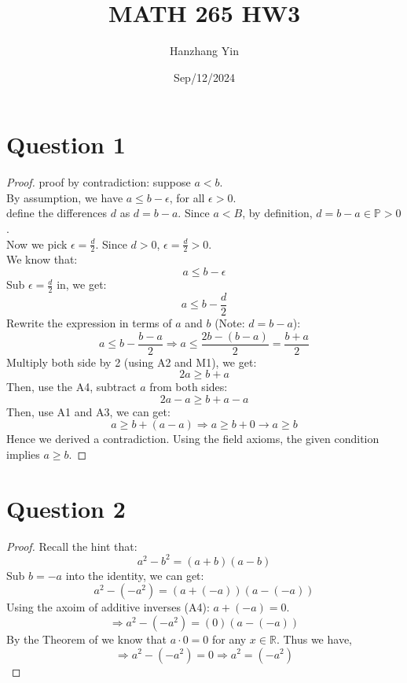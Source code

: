 \documentclass{article}
\title{MATH 265 HW3}
\author{Hanzhang Yin}
\date{Sep/12/2024}
\begin{document}
\maketitle

\section*{Question 1}
\begin{proof}
    proof by contradiction: suppose $a < b$.
    \\
    By assumption, we have $a \leq b - \epsilon$, for all $\epsilon > 0$.
    \\
    define the differences $d$ as $d = b - a$. Since $a < B$, by definition, $d = b - a \in \mathbb{P} > 0$.
    \\
    Now we pick $\epsilon = \frac{d}{2}$. Since $d > 0$, $\epsilon = \frac{d}{2} > 0$.
    \\
    We know that:
    \[ a \leq b - \epsilon \]
    Sub $\epsilon = \frac{d}{2}$ in, we get:
    \[ a \leq b - \frac{d}{2} \]
    Rewrite the expression in terms of $a$ and $b$ (Note: $d = b - a$):
    \[ a \leq b - \frac{b - a}{2} \Rightarrow a \leq \frac{2b - (b - a)}{2} = \frac{b + a}{2} \]
    Multiply both side by 2 (using A2 and M1), we get:
    \[ 2a \geq b + a \]
    Then, use the A4, subtract $a$ from both sides:
    \[ 2a - a \geq b + a - a \]
    Then, use A1 and A3, we can get:
    \[ a \geq b + (a - a) \Rightarrow a \geq b + 0 \rightarrow a \geq b \]
    Hence we derived a contradiction. Using the field axioms, the given condition implies $a \geq b$.
\end{proof}

\section*{Question 2}
\begin{proof}
    Recall the hint that:
    \[ a^2 - b^2 = (a + b)(a - b) \]
    Sub $b = -a$ into the identity, we can get:
    \[ a^2 - (-a^2) = (a + (-a))(a - (-a)) \]
    Using the axoim of additive inverses (A4): $a + (-a) = 0$.
    \[ \Rightarrow a^2 - (-a^2) = (0)(a - (-a)) \]
    By the Theorem of we know that $a \cdot 0 = 0$ for any $x \in \mathbb{R}$. Thus we have,
    \[ \Rightarrow a^2 - (-a^2) = 0 \Rightarrow a^2  = (-a^2) \]
\end{proof}
\end{document}
